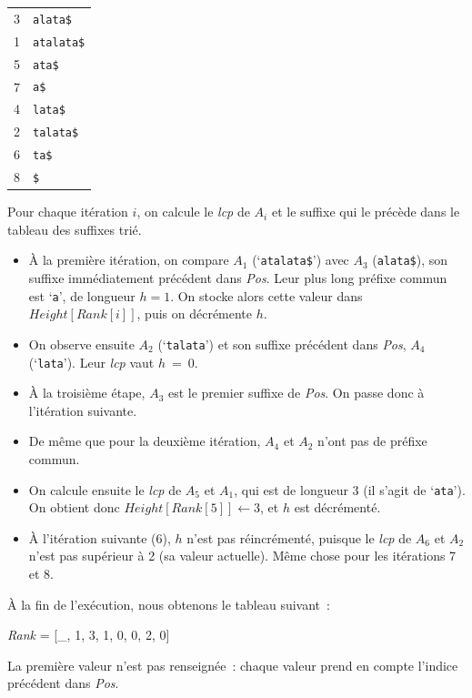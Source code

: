 \documentclass[a4paper,11pt]{article}
\begin{document}
\footnotesize
\begin{tabular}{rl}
3 & \texttt{alata\$}\\
1 & \texttt{atalata\$}\\
5 & \texttt{ata\$}\\
7 & \texttt{a\$}\\
4 & \texttt{lata\$}\\
2 & \texttt{talata\$}\\
6 & \texttt{ta\$}\\
8 & \texttt{\$}\\
\end{tabular}
\normalsize

Pour chaque itération $i$, on calcule le \textit{lcp} de $A_i$ et le
suffixe qui le précède dans le tableau des suffixes trié.

\begin{itemize}
\item À la première itération, on compare $A_1$ (`\texttt{atalata\$}') avec
$A_3$ (\texttt{alata\$}), son suffixe immédiatement précédent dans
\textit{Pos}. Leur plus long préfixe commun est `\texttt{a}', de
longueur $h = 1$. On stocke alors cette valeur dans
$\mathit{Height}[\mathit{Rank}[i]]$, puis on décrémente $h$.

\item On observe ensuite $A_2$ (`\texttt{talata}') et son suffixe précédent
dans \textit{Pos}, $A_4$ (`\texttt{lata}'). Leur \textit{lcp} vaut
$h~=~0$.

\item À la troisième étape, $A_3$ est le premier suffixe de \textit{Pos}. On
passe donc à l'itération suivante.

\item De même que pour la deuxième itération, $A_4$ et $A_2$ n'ont pas de
préfixe commun.

\item On calcule ensuite le \textit{lcp} de $A_5$ et $A_1$, qui est de
longueur 3 (il s'agit de `\texttt{ata}'). On obtient donc
$\mathit{Height}[\mathit{Rank}[5]] ← 3$, et $h$ est décrémenté.

\item À l'itération suivante (6), $h$ n'est pas réincrémenté, puisque le
\textit{lcp} de $A_6$ et $A_2$ n'est pas supérieur à 2 (sa valeur
actuelle). Même chose pour les itérations 7 et 8.
\end{itemize}

À la fin de l'exécution, nous obtenons le tableau suivant~:
\begin{center}
  \textit{Rank} = [\_, 1, 3, 1, 0, 0, 2, 0]
\end{center}
La première valeur n'est pas renseignée~: chaque valeur prend en
compte l'indice précédent dans \textit{Pos}.
\end{document}
